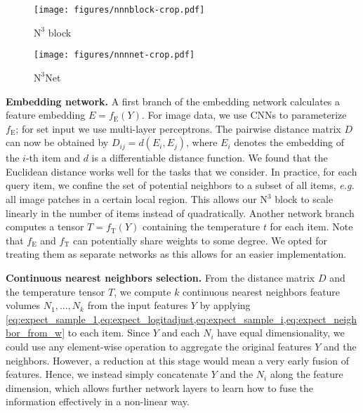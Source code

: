 \documentclass{article}
\makeatletter
\newcommand{\eg}{\emph{e.\thinspace{}g.}\@\xspace}
\newcommand{\myparagraph}[1]{\smallskip\noindent\textbf{#1}}
\newcommand\DD{D}
\newcommand\dist{d}
\newcommand\kk{k}
\newcommand\tcat{t}
\newcommand\Tcat{T}
\newcommand\nnn{\text{N}^3}
\newcommand\OO{Y}
\makeatother
\begin{document}
\begin{figure*}[tb]
\centering
	\begin{subfigure}[b]{0.46\textwidth}
	\texttt{[image: figures/nnnblock-crop.pdf]}
	\caption{$\nnn$ block}
	\label{fig:overview_nnnblock}
	\end{subfigure}
	\hfill
	\begin{subfigure}[b]{0.46\textwidth}
	\texttt{[image: figures/nnnnet-crop.pdf]}
	\caption{$\nnn$Net}
	\label{fig:overview_nnnnet}
	\end{subfigure}
\caption{\emph{()} In a neural nearest neighbors ($\nnn$) block (shaded box), 
an embedding network takes the output $\OO$ of a previous layer 
and calculates a pairwise distance matrix $\DD$ between elements in $\OO$ as well as a temperature parameter ($\Tcat$, red feature layer) for each element.
These are used to produce a stack of continuous nearest neighbors volumes $N_1, \dots, N_{\kk}$ (green), 
which are then concatenated with $\OO$.
We build an $\nnn$Net \emph{()} by interleaving common local processing networks (\eg, DnCNN \cite{Zhang:2017:BGD} or VDSR \cite{Kim:2016:VDSR})
 with $\nnn$ blocks.}
\label{fig:overview}
\vspace{-0.5em}
\end{figure*}




\myparagraph{Embedding network.}
A first branch of the embedding network calculates a feature embedding $E = f_\text{E}(\OO)$.
For image data, we use CNNs to parameterize $f_\text{E}$; for set input we use multi-layer perceptrons.
The pairwise distance matrix $\DD$ can now be obtained by $\DD_{ij} = \dist(E_i, E_j)$,
where $E_i$ denotes the embedding of the $i$-th item and $\dist$ is a differentiable distance function.
We found that the Euclidean distance works well for the tasks that we consider.
In practice, for each query item, we confine the set of potential neighbors to a subset of all items, \eg all image patches in a certain local region. 
This allows our $\nnn$ block to scale linearly in the number of items instead of quadratically.
Another network branch computes a tensor $\Tcat = f_\text{T}(\OO)$ containing the temperature $\tcat$ for each item.
Note that $f_\text{E}$ and $f_\text{T}$ can potentially share weights to some degree.
We opted for treating them as separate networks as this allows for an easier implementation.

\myparagraph{Continuous nearest neighbors selection.}
From the distance matrix $\DD$ and the temperature
tensor $\Tcat$, we compute $\kk$ continuous nearest neighbors feature volumes
$N_1, \dots, N_{\kk}$ from the input features $\OO$ by applying
\cref{eq:expect_sample_1,eq:expect_logitadjust,eq:expect_sample_i,eq:expect_neighbor_from_w} to each item.
Since $\OO$ and each $N_i$ have equal dimensionality, we could use any element-wise operation to aggregate the original features $\OO$ and the neighbors. 
However, a reduction at this stage would mean a very early fusion of features. 
Hence, we instead simply concatenate $\OO$ and the $N_i$ along the feature dimension, which allows further network layers to learn how to fuse the information effectively in a non-linear way. 
\end{document}
